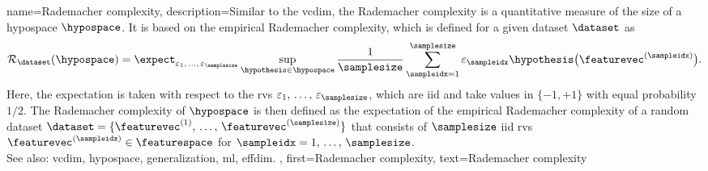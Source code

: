 {name={Rademacher complexity},
 	description={Similar to the \gls{vcdim}, the Rademacher 
		complexity \cite{bartlett2002rademacher} is a quantitative \gls{measure} 
		of the size of a \gls{hypospace} $\hypospace$. It is based on the 
		empirical Rademacher complexity, which is defined for a given \gls{dataset} 
		$\dataset$ as
		\begin{equation}
			\nonumber
    			\mathcal{R}_\dataset(\hypospace) 
    			= 
    			\expect_{\varepsilon_{1},\,\ldots,\,\varepsilon_{\samplesize} } 
			\sup_{\hypothesis \in \hypospace} \frac{1}{\samplesize} \sum_{\sampleidx=1}^\samplesize \varepsilon_\sampleidx 
			\hypothesis\big(\featurevec^{(\sampleidx)} \big).
    		\end{equation}
		Here, the \gls{expectation} is taken with respect to 
		the \glspl{rv} $\varepsilon_{1},\,\ldots,\,\varepsilon_{\samplesize}$,
		which are \gls{iid} and take values in $\{ -1, +1 \}$ with equal 
		\gls{probability} $1/2$. The Rademacher complexity of $\hypospace$ is 
		then defined as the \gls{expectation} of the empirical Rademacher complexity 
		of a random \gls{dataset} $\dataset = \{\featurevec^{(1)}, \,\hdots, \,\featurevec^{(\samplesize)}\}$
		that consists of $\samplesize$ \gls{iid} \glspl{rv} $\featurevec^{(\sampleidx)} \in \featurespace$ 
		for $\sampleidx=1,\,\ldots,\,\samplesize$.  
		\\
        		See also: \gls{vcdim}, \gls{hypospace}, \gls{generalization}, \gls{ml}, \gls{effdim}. },
	first={Rademacher complexity},
	text={Rademacher complexity}  
}


